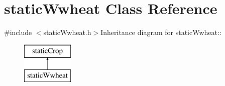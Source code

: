 \hypertarget{classstatic_wwheat}{
\section{staticWwheat Class Reference}
\label{classstatic_wwheat}
}


{\ttfamily \#include $<$staticWwheat.h$>$}Inheritance diagram for staticWwheat::\begin{figure}[H]
\begin{center}
\leavevmode
\includegraphics[height=2cm]{classstatic_wwheat}
\end{center}
\end{figure}
